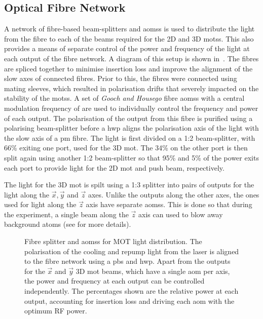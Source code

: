 \subsection{Optical Fibre Network}
A network of fibre-based beam-splitters and \acp{aoms} is used to distribute the
light from the \Muquans fibre to each of the beams required for the 2D and 3D
\acp{mots}. This also provides a means of separate control of the power and
frequency of the light at each output of the fibre network. A diagram of this
setup is shown in~. The fibres are spliced together
to minimise insertion loss and improve the alignment of the slow axes of
connected fibres. Prior to this, the fibres were connected using mating sleeves,
which resulted in polarisation drifts that severely impacted on the stability of
the \acp{mots}. A set of \textit{Gooch and Housego} fibre \acp{aoms} with a
central modulation frequency of  are used to
individually control the frequency and power of each output. The polarisation of
the output from this fibre is purified using a polarising beam-splitter before a
\ac{hwp} aligns the polarisation axis of the light with the slow axis of a
\ac{pm} fibre. The light is first divided on a 1:2 beam-splitter, with 66\%
exiting one port, used for the 3D \ac{mot}. The 34\% on the other port is then
split again using another 1:2 beam-splitter so that 95\% and 5\% of the power
exits each port to provide light for the 2D \ac{mot} and push beam,
respectively. \par\noindent The light for the 3D \ac{mot} is spilt using a 1:3
splitter into pairs of outputs for the light along the \(\vec{x},\vec{y}\) and
\(\vec{z}\) axes. Unlike the outputs along the other axes, the ones used for
light along the \(\vec{z}\) axis have separate \acp{aoms}. This is done so that
during the experiment, a single beam along the \(\vec{z}\) axis can used to blow
away background atoms (see  for more details).

\begin{figure}[!htbp]
	\centering
	\def\svgwidth{0.65\textwidth}
	\small{}
	\caption[Network of optical fibre splitters and \acp{aoms} for \ac{MOT}light distribution]{Fibre splitter and \acp{aoms} for \ac{MOT} light distribution. The polarisation of the cooling and repump light from the \Muquans laser is aligned to the fibre network using a \ac{pbs} and \ac{hwp}. Apart from the outputs for the \(\vec{x}\) and \(\vec{y}\) 3D \ac{mot} beams, which have a single \ac{aom} per axis, the power and frequency at each output can be controlled independently. The percentages shown are the relative power at each output, accounting for insertion loss and driving each \ac{aom} with the optimum RF power.}
	\label{fig:fibre_network}
\end{figure}
